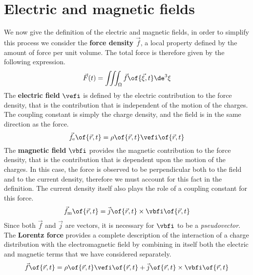 \section{Electric and magnetic fields}
We now give the definition of the electric and magnetic fields, in order to simplify
this process we consider the \textbf{force density} \(\vec{f}\), a local property
defined by the amount of force per unit volume.
The total force is therefore given by the following expression.
\[\vec{F}(t) = \iiint_\Omega \vec{f}\of{\vec{\xi},t} \de^3 \xi\]
The \textbf{electric field} \(\vefi\) is defined by the electric contribution to
the force density, that is the contribution that is independent of the motion of
the charges.
The coupling constant is simply the charge density, and the field is in the same
direction as the force.
\[\vec{f}_\mathrm{e}\of{\vec{r},t} = \rho\of{\vec{r},t}\vefi\of{\vec{r},t}\]
The \textbf{magnetic field} \(\vbfi\) provides the magnetic contribution to the
force density, that is the contribution that is dependent upon the motion of the
charges.
In this case, the force is observed to be perpendicular both to the field and to
the current density, therefore we must account for this fact in the definition.
The current density itself also plays the role of a coupling constant for this force.
\[\vec{f}_\mathrm{m}\of{\vec{r},t} = \vec{j}\of{\vec{r},t} \times \vbfi\of{\vec{r},t}\]
Since both \(\vec{f}\) and \(\vec{j}\) are vectors, it is necessary for \(\vbfi\)
to be a \emph{pseudovector}.\\[1em]
The \textbf{Lorentz force} provides a complete description of the interaction of
a charge distribution with the electromagnetic field by combining in itself both
the electric and magnetic terms that we have considered separately.
\begin{equation}
  \vec{f}\of{\vec{r},t} = \rho\of{\vec{r},t}\vefi\of{\vec{r},t} + \vec{j}\of{\vec{r},t} \times \vbfi\of{\vec{r},t}
\end{equation}
